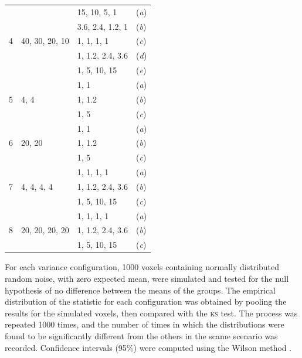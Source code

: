 \begin{table}[!p]
\begin{center}
{\begin{tabular}{@{}m{20mm}<{\raggedright}m{28mm}<{\raggedright}m{23mm}<{\raggedright}m{10mm}<{\centering}@{}}
\midrule
\multirow{5}{*}{4} & \multirow{5}{*}{40, 30, 20, 10} & 15, 10, 5, 1     & (\emph{a}) \\
{}                 & {}                              & 3.6, 2.4, 1.2, 1 & (\emph{b}) \\
{}                 & {}                              & 1, 1, 1, 1       & (\emph{c}) \\
{}                 & {}                              & 1, 1.2, 2.4, 3.6 & (\emph{d}) \\
{}                 & {}                              & 1, 5, 10, 15     & (\emph{e}) \\
\midrule
\multirow{3}{*}{5} & \multirow{3}{*}{4, 4}   & 1, 1   & (\emph{a}) \\
{}                 & {}                      & 1, 1.2 & (\emph{b}) \\
{}                 & {}                      & 1, 5   & (\emph{c}) \\
\midrule
\multirow{3}{*}{6} & \multirow{3}{*}{20, 20} & 1, 1   & (\emph{a}) \\
{}                 & {}                      & 1, 1.2 & (\emph{b}) \\
{}                 & {}                      & 1, 5   & (\emph{c}) \\
\midrule
\multirow{3}{*}{7} & \multirow{3}{*}{4, 4, 4, 4} & 1, 1, 1, 1       & (\emph{a}) \\
{}                 & {}                          & 1, 1.2, 2.4, 3.6 & (\emph{b}) \\
{}                 & {}                          & 1, 5, 10, 15     & (\emph{c}) \\
\midrule
\multirow{3}{*}{8} & \multirow{3}{*}{20, 20, 20, 20} & 1, 1, 1, 1       & (\emph{a}) \\
{}                 & {}                              & 1, 1.2, 2.4, 3.6 & (\emph{b}) \\
{}                 & {}                              & 1, 5, 10, 15     & (\emph{c}) \\
\bottomrule
\end{tabular}}
\end{center}
\label{tab:kolmo}
\end{table}

For each variance configuration, 1000 voxels containing normally distributed random noise, with zero expected mean, were simulated and tested for the null hypothesis of no difference between the means of the groups. The empirical distribution of the statistic for each configuration was obtained by pooling the results for the simulated voxels, then compared with the \textsc{ks} test. The process was repeated 1000 times, and the number of times in which the distributions were found to be significantly different from the others in the scame scenario was recorded. Confidence intervals (95\%) were computed using the Wilson method \citep{Wilson1927}.


